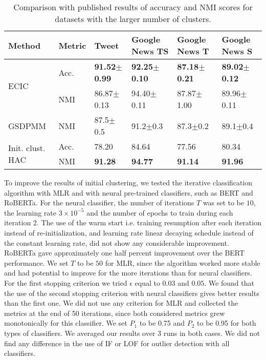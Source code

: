 \documentclass[11pt,a4paper]{article}
\begin{document}
\begin{table*}
\centering
\begin{tabular}{llllll}
\hline
\textbf{Method} &  \textbf{Metric} & \textbf{Tweet} & \textbf{Google News TS} & \textbf{Google News T} & \textbf{Google News S} \\
\hline
\multirow{2}{4em}{ECIC} & Acc. & \textbf{91.52$\pm$0.99} & \textbf{92.25$\pm$0.10} & \textbf{87.18$\pm$0.21} & \textbf{89.02$\pm$0.12} \\
& NMI &  86.87$\pm$0.13 & 94.40$\pm$0.11 & 87.87$\pm$1.00 & 89.96$\pm$0.11 \\
\hline
GSDPMM & NMI & 87.5$\pm$0.5 & 91.2$\pm$0.3 & 87.3$\pm$0.2 & 89.1$\pm$0.4 \\
\hline
\multirow{2}{4em}{Init. clust. HAC} & Acc. & 78.20 & 84.64 & 77.56 & 80.34 \\
& NMI & \textbf{91.28} & \textbf{94.77} & \textbf{91.14} & \textbf{91.96} \\
\hline
\end{tabular}
\caption{Comparison with published results of accuracy and NMI scores for datasets with the larger number of clusters.} 
\label{sota2}
\end{table*}

To improve the results of initial clustering, we tested the iterative classification algorithm with MLR and with neural pre-trained classifiers, such as BERT and RoBERTa. For the neural classifier, the number of iterations $T$ was set to be $10$, the learning rate $3\times 10^{-5}$ and the number of epochs to train during each iteration $2$. The use of the warm start i.e. training resumption after each iteration instead of re-initialization, and learning rate linear decaying schedule instead of the constant learning rate, did not show any considerable improvement. RoBERTa gave approximately one half percent improvement over the BERT performance. We set $T$ to be $50$ for MLR, since the algorithm worked more stable and had potential to improve for the more iterations than for neural classifiers. For the first stopping criterion we tried $\epsilon$ equal to $0.03$ and $0.05$. We found that the use of the second stopping criterion with neural classifiers gives better results than the first one. We did not use any criterion for MLR  and collected the metrics at the end of 50 iterations, since both considered metrics grew monotonically for this classifier. We set $P_1$ to be 0.75 and $P_2$ to be 0.95 for both types of classifiers. We averaged our results over 3 runs in both cases. We did not find any difference in the use of IF or LOF for outlier detection with all classifiers. 
\end{document}

